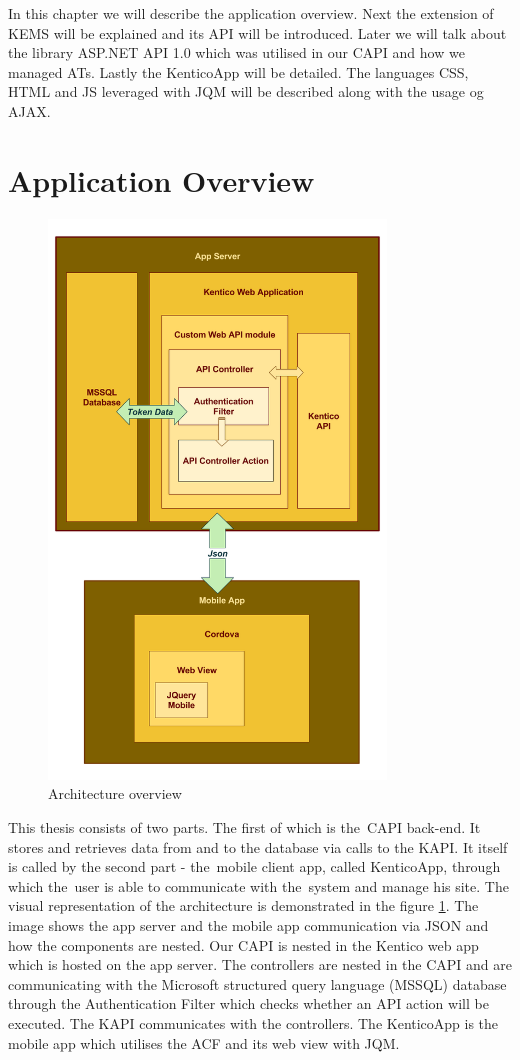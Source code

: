 In this chapter we will describe the application overview. Next the extension of KEMS will be explained and its API will be introduced. Later we will talk about the library ASP.NET API 1.0 which was utilised in our CAPI and how we managed ATs. Lastly the KenticoApp will be detailed. The languages CSS, HTML and JS leveraged with JQM will be described along with the usage og AJAX.
\section{Application Overview}
\begin{figure}[ht!]
  \centering
  \includegraphics[width=0.8\textwidth]{Images/Architecture.png}
  \caption{Architecture overview}
  \label{architectureOverview}
\end{figure}
This thesis consists of two parts. The first of which is the~CAPI back-end. It stores and retrieves data from and to the database via calls to the KAPI. It itself is called by the second part - the~mobile client app, called KenticoApp, through which the~user is able to communicate with the~system and manage his site. The visual representation of the architecture is demonstrated in the figure \ref{architectureOverview}. The image shows the app server and the mobile app communication via JSON and how the components are nested. Our CAPI is nested in the Kentico web app which is hosted on the app server. The controllers are nested in the CAPI and are communicating with the Microsoft structured query language (MSSQL) database through the Authentication Filter which checks whether an API action will be executed. The KAPI communicates with the controllers. The KenticoApp is the mobile app which utilises the ACF and its web view with JQM. 

